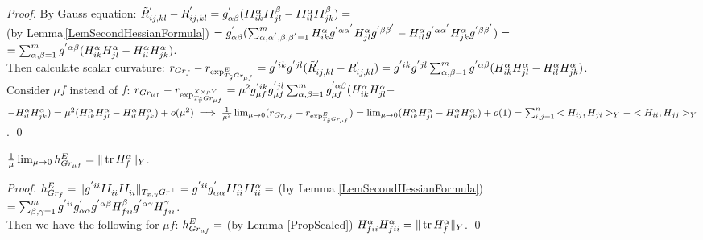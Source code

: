 \documentclass{llncs}
\newcommand {\tr}{{\,}\mathrm{tr}{\,}}
\begin{document}
\begin{proof}
By Gauss equation: $\tilde{R}_{ij, kl}^{'} - R_{ij, kl}^{'} = 
g_{\alpha \beta}^{'} ( \tensor*{II}{^{\alpha}_{ik}} \tensor*{II}{^{\beta}_{jl}} - \tensor*{II}{^{\alpha}_{il}} \tensor*{II}{^{\beta}_{jk}} ) 
=$ 
\\ (by Lemma\,\ref{LemSecondHessianFormula})  
$=g_{\alpha \beta}^{'} (\sum_{\alpha, \alpha^{'}, \beta, \beta^{'}=1}^{m} 
\tensor*{H}{^{\alpha}_{ik}} \tensor*{g}{^{'}^{\alpha}^{\alpha^{'}}}
\tensor*{H}{^{\alpha}_{jl}} \tensor*{g}{^{'}^{\beta}^{\beta^{'}}} - 
\tensor*{H}{^{\alpha}_{il}} \tensor*{g}{^{'}^{\alpha}^{\alpha^{'}}}
\tensor*{H}{^{\alpha}_{jk}} \tensor*{g}{^{'}^{\beta}^{\beta^{'}}}) = $
\\
$= \sum_{\alpha, \beta =1}^{m} g^{' \alpha \beta} 
(\tensor*{H}{^{\alpha}_{ik}} \tensor*{H}{^{\alpha}_{jl}} - 
\tensor*{H}{^{\alpha}_{il}} \tensor*{H}{^{\alpha}_{jk}})$. 
\\
Then calculate scalar curvature: $r_{Gr_f} - r_{\tensor*{\exp}{^E_{T_{\tilde{y}} Gr_{\mu f}}}} = 
\tensor*{g}{^{'}^i^k}\tensor*{g}{^{'}^j^l}(\tilde{R}_{ij, kl}^{'} - R_{ij, kl}^{'}) = 
\tensor*{g}{^{'}^i^k}\tensor*{g}{^{'}^j^l}
\sum_{\alpha, \beta =1}^{m} g^{' \alpha \beta} 
(\tensor*{H}{^{\alpha}_{ik}} \tensor*{H}{^{\alpha}_{jl}} - 
\tensor*{H}{^{\alpha}_{il}} \tensor*{H}{^{\alpha}_{jk}})$.
\\
Consider $\mu f$ instead of $f$:
$r_{Gr_{\mu f}} - r_{\tensor*{\exp}{^{X\times \mu Y}_{T_{\tilde{y}} Gr_{\mu f}}}} 
= 
\mu^{2} \tensor*{g}{_{\mu f}^{'}^i^k}\tensor*{g}{_{\mu f}^{'}^j^l}
\sum_{\alpha, \beta =1}^{m} \tensor*{g}{_{\mu f}^'^\alpha^\beta} 
(\tensor*{H}{^{\alpha}_{ik}} \tensor*{H}{^{\alpha}_{jl}} - $ 
$ - \tensor*{H}{^{\alpha}_{il}} \tensor*{H}{^{\alpha}_{jk}})
= 
\mu^{2} 
(\tensor*{H}{^{\alpha}_{ik}} \tensor*{H}{^{\alpha}_{jl}} - 
\tensor*{H}{^{\alpha}_{il}} \tensor*{H}{^{\alpha}_{jk}}) + o(\mu ^ {2}) 
\implies 
\frac{1}{\mu^{2}}\lim_{\mu\to 0} ( r_{Gr_{\mu f}} - r_{\tensor*{\exp}{^E_{T_{\tilde{y}} Gr_{\mu f}}}} )
=
\lim_{\mu\to 0} (\tensor*{H}{^{\alpha}_{ik}} \tensor*{H}{^{\alpha}_{jl}} - 
\tensor*{H}{^{\alpha}_{il}} \tensor*{H}{^{\alpha}_{jk}}) + o(1) 
= \sum_{i,j=1}^{n}{<H_{ij},H_{ji}>_Y-<H_{ii},H_{jj}>_Y}$.
\qed
\end{proof}

\begin{lemma} \label{LemMean}
$\frac{1}{\mu}\lim_{\mu\to 0} \tensor*{h}{^E_{Gr_{\mu f}}} = \|\tr H_f^\alpha\|_Y$.
\end{lemma}

\begin{proof}
$\tensor*{h}{^E_{Gr_f}} = \| g^{'ii} \tensor*{II}{_i_i} \tensor*{II}{_i_i} \|_{T_{x, y}Gr^{\bot}}
= g^{'ii} g^{'}_{\alpha \alpha} \tensor*{II}{^\alpha _i_i} \tensor*{II}{^\alpha _i_i} = $ (by Lemma \ref{LemSecondHessianFormula})
\\$=\sum_{\beta, \gamma = 1}^{m} g^{'ii} g^{'}_{\alpha \alpha} g^{'\alpha\beta} \tensor*{H}{_f^\beta _i_i} g^{'\alpha\gamma} \tensor*{H}{_f^\gamma _i_i}$.
\\
Then we have the following for $\mu f$:
$\tensor*{h}{^E_{Gr_{\mu f}}} 
=$ (by Lemma \ref{PropScaled}) $\tensor*{H}{_f^\alpha _i_i} \tensor*{H}{_f^\alpha _i_i}
= \|\tr H_f^\alpha\|_Y$.
\qed
\end{proof}
\end{document}
